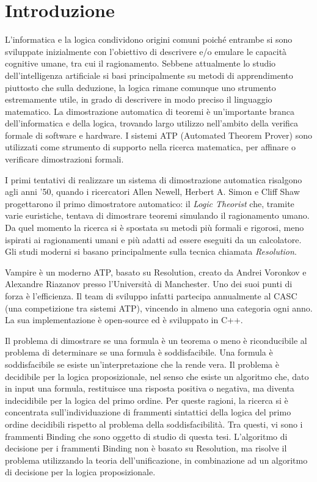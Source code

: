 \documentclass[./main.tex]{subfiles}
\begin{document}
\chapter*{Introduzione}


L'informatica e la logica condividono origini comuni poiché 
entrambe si sono sviluppate inizialmente con l'obiettivo di descrivere e/o 
emulare le capacità cognitive umane, tra cui il ragionamento.
Sebbene attualmente lo studio dell'intelligenza artificiale si basi principalmente su metodi di apprendimento 
piuttosto che sulla deduzione, la logica rimane comunque uno strumento estremamente utile,
in grado di descrivere in modo preciso il linguaggio matematico.
La dimostrazione automatica di teoremi è un'importante branca dell'informatica e della logica,
trovando largo utilizzo nell'ambito della verifica formale di software e hardware.
I sistemi ATP (Automated Theorem Prover) sono utilizzati come strumento di supporto 
nella ricerca matematica, per affinare o verificare dimostrazioni formali.
%

I primi tentativi di realizzare un sistema 
di dimostrazione automatica risalgono agli anni '50,
quando i ricercatori Allen Newell, Herbert A. Simon e Cliff Shaw
progettarono il primo dimostratore automatico: il \textit{Logic Theorist}
che, tramite varie euristiche, tentava di dimostrare teoremi simulando il ragionamento umano. 
Da quel momento la ricerca si è spostata su metodi più formali e rigorosi,
meno ispirati ai ragionamenti umani e più adatti ad essere eseguiti da un calcolatore.
Gli studi moderni si basano principalmente sulla tecnica chiamata \textit{Resolution}.
%  

Vampire è un moderno ATP, basato su Resolution, creato da Andrei Voronkov e Alexandre Riazanov presso l'Università di Manchester.
Uno dei suoi punti di forza è l’efficienza. Il team di sviluppo infatti partecipa
annualmente al CASC (una competizione tra sistemi ATP),
vincendo in almeno una categoria ogni anno.
La sua implementazione è open-source ed è sviluppato in C++.

%

Il problema di dimostrare se una formula è un teorema o meno è riconducibile al problema di determinare
se una formula è soddisfacibile.
Una formula è soddisfacibile se esiste un'interpretazione che la rende vera.
Il problema è decidibile per la logica proposizionale, nel senso che esiste un algoritmo
che, dato in input una formula, restituisce una risposta positiva o negativa,
ma diventa indecidibile per la logica del primo ordine.
Per queste ragioni, la ricerca si è concentrata sull'individuazione di frammenti sintattici della logica del primo ordine
decidibili rispetto al problema della soddisfacibilità.
Tra questi, vi sono i frammenti Binding che sono oggetto di studio di questa tesi.
L'algoritmo di decisione per i frammenti Binding non è basato su Resolution,
ma risolve il problema utilizzando la teoria dell'unificazione, in combinazione 
ad un algoritmo di decisione per la logica proposizionale.
% 
\end{document}
